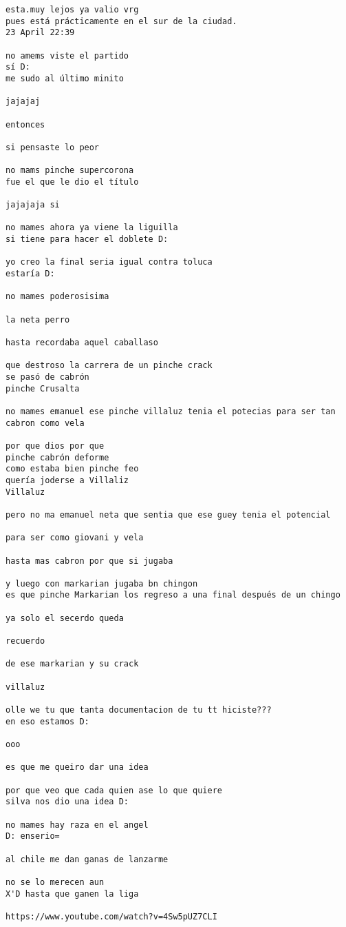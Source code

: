 \begin{verbatim}
esta.muy lejos ya valio vrg
pues está prácticamente en el sur de la ciudad.
23 April 22:39

no amems viste el partido
sí D:
me sudo al último minito

jajajaj

entonces

si pensaste lo peor

no mams pinche supercorona
fue el que le dio el título 

jajajaja si

no mames ahora ya viene la liguilla
si tiene para hacer el doblete D:

yo creo la final seria igual contra toluca
estaría D:

no mames poderosisima

la neta perro

hasta recordaba aquel caballaso

que destroso la carrera de un pinche crack
se pasó de cabrón
pinche Crusalta 

no mames emanuel ese pinche villaluz tenia el potecias para ser tan cabron como vela

por que dios por que
pinche cabrón deforme
como estaba bien pinche feo
quería joderse a Villaliz
Villaluz

pero no ma emanuel neta que sentia que ese guey tenia el potencial

para ser como giovani y vela

hasta mas cabron por que si jugaba

y luego con markarian jugaba bn chingon
es que pinche Markarian los regreso a una final después de un chingo

ya solo el secerdo queda

recuerdo

de ese markarian y su crack

villaluz

olle we tu que tanta documentacion de tu tt hiciste???
en eso estamos D:

ooo

es que me queiro dar una idea

por que veo que cada quien ase lo que quiere
silva nos dio una idea D:

no mames hay raza en el angel
D: enserio=

al chile me dan ganas de lanzarme

no se lo merecen aun
X'D hasta que ganen la liga

https://www.youtube.com/watch?v=4Sw5pUZ7CLI


\end{verbatim}
